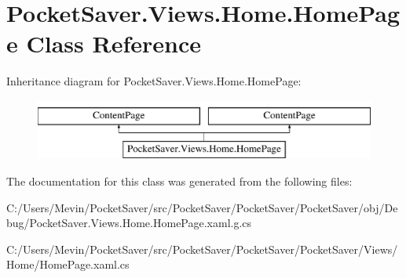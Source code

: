 \hypertarget{class_pocket_saver_1_1_views_1_1_home_1_1_home_page}{}\section{Pocket\+Saver.\+Views.\+Home.\+Home\+Page Class Reference}
\label{class_pocket_saver_1_1_views_1_1_home_1_1_home_page}
Inheritance diagram for Pocket\+Saver.\+Views.\+Home.\+Home\+Page\+:\begin{figure}[H]
\begin{center}
\leavevmode
\includegraphics[height=2.000000cm]{class_pocket_saver_1_1_views_1_1_home_1_1_home_page}
\end{center}
\end{figure}


The documentation for this class was generated from the following files\+:\begin{DoxyCompactItemize}
\item 
C\+:/\+Users/\+Mevin/\+Pocket\+Saver/src/\+Pocket\+Saver/\+Pocket\+Saver/\+Pocket\+Saver/obj/\+Debug/Pocket\+Saver.\+Views.\+Home.\+Home\+Page.\+xaml.\+g.\+cs\item 
C\+:/\+Users/\+Mevin/\+Pocket\+Saver/src/\+Pocket\+Saver/\+Pocket\+Saver/\+Pocket\+Saver/\+Views/\+Home/Home\+Page.\+xaml.\+cs\end{DoxyCompactItemize}
